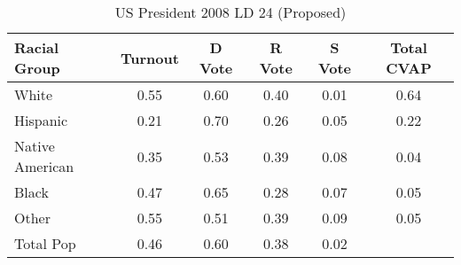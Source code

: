 \begin{table}[htb]
\begin{center}
\caption{US President 2008 LD 24 (Proposed)}
\label{pres08_cvap_ld_24}
\begin{tabular}{lccccc}
  \hline
Racial Group & Turnout & D Vote & R Vote & S Vote & Total CVAP \\ 
  \hline
White & 0.55 & 0.60 & 0.40 & 0.01 & 0.64 \\ 
  Hispanic & 0.21 & 0.70 & 0.26 & 0.05 & 0.22 \\ 
  Native American & 0.35 & 0.53 & 0.39 & 0.08 & 0.04 \\ 
  Black & 0.47 & 0.65 & 0.28 & 0.07 & 0.05 \\ 
  Other & 0.55 & 0.51 & 0.39 & 0.09 & 0.05 \\ 
  Total Pop & 0.46 & 0.60 & 0.38 & 0.02 &  \\ 
   \hline
\end{tabular}
\end{center}
\end{table}
